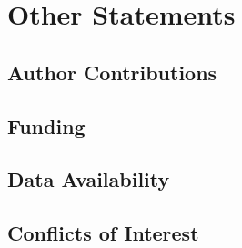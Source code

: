 \section{Other Statements}

\subsection{Author Contributions}

\subsection{Funding}

\subsection{Data Availability}

\subsection{Conflicts of Interest}